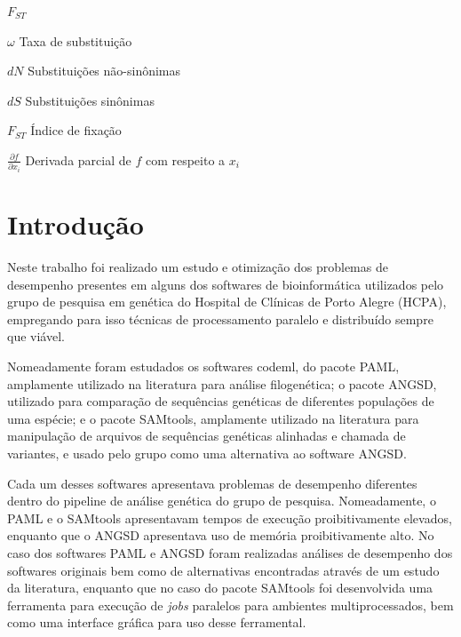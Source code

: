 \documentclass[cic,tc]{iiufrgs}
\begin{document}
\begin{listofsymbols}{$F_{ST}$}
    \item[$\omega$] Taxa de substituição
    \item[$dN$] Substituições não-sinônimas
    \item[$dS$] Substituições sinônimas
    \item[$F_{ST}$] Índice de fixação
    \item[$\frac{\partial f}{\partial x_i}$] Derivada parcial de $f$ com respeito a $x_i$
\end{listofsymbols}

\tableofcontents


\chapter{Introdução}

Neste trabalho foi realizado um estudo e otimização dos problemas de desempenho
presentes em alguns dos softwares de bioinformática utilizados pelo grupo de
pesquisa em genética do Hospital de Clínicas de Porto Alegre (HCPA), empregando
para isso técnicas de processamento paralelo e distribuído sempre que viável.

Nomeadamente foram estudados os softwares codeml, do pacote
PAML,\cite{yang2007paml} amplamente utilizado na literatura para análise
filogenética;\cite{maldonado2016lmap} o pacote ANGSD, utilizado para comparação
de sequências genéticas de diferentes populações de uma
espécie;\cite{korneliussen2014angsd} e o pacote SAMtools, amplamente utilizado
na literatura para manipulação de arquivos de sequências genéticas
alinhadas e chamada de variantes,\cite{danecek2021twelve} e usado pelo grupo
como uma alternativa ao software ANGSD.

Cada um desses softwares apresentava problemas de desempenho diferentes dentro
do pipeline de análise genética do grupo de pesquisa. Nomeadamente, o PAML e o
SAMtools apresentavam tempos de execução proibitivamente elevados, enquanto que
o ANGSD apresentava uso de memória proibitivamente alto. No caso dos softwares
PAML e ANGSD foram realizadas análises de desempenho dos softwares originais
bem como de alternativas encontradas através de um estudo da literatura,
enquanto que no caso do pacote SAMtools foi desenvolvida uma ferramenta para
execução de \textit{jobs} paralelos para ambientes multiprocessados, bem como
uma interface gráfica para uso desse ferramental.
\end{document}
